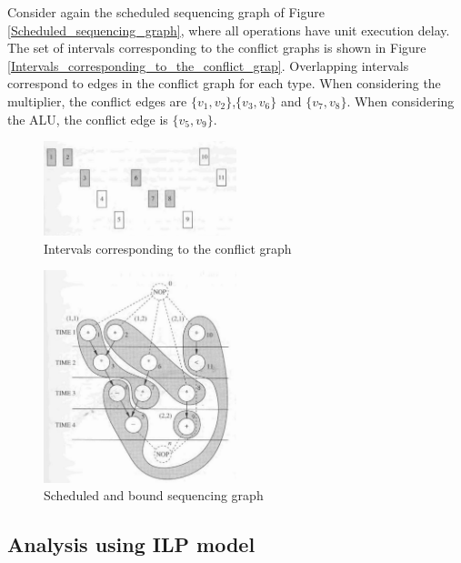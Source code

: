 Consider again the scheduled sequencing graph of Figure \ref{Scheduled_sequencing_graph}, where all operations have unit execution delay. The set of intervals corresponding to the conflict graphs is shown in Figure \ref{Intervals_corresponding_to_the_conflict_grap}. Overlapping intervals correspond to edges in the conflict 
graph for each type. When considering the multiplier, the conflict edges are $ \{v_{1},v_{2}\} $,$ \{v_{3},v_{6}\} $ and $ \{v_{7},v_{8}\} $. When considering the ALU, the conflict edge is $ \{v_{5},v_{9}\} $.


\begin{figure}[h]
    \centering
    \includegraphics[width=0.5\textwidth]{Intervals_corresponding_to_the_conflict_grap}
    \caption{ Intervals corresponding to the conflict graph \cite{b1}}
    \label{fig:Intervals_corresponding_to_the_conflict_grap}
\end{figure}


\begin{figure}[h]
    \centering
    \includegraphics[width=0.5\textwidth]{Scheduled_an_bound_sequencing}
    \caption{ Scheduled and bound sequencing graph \cite{b1}}
    \label{fig:Scheduled_an_bound_sequencing}
\end{figure}

\subsection{Analysis using ILP model}

